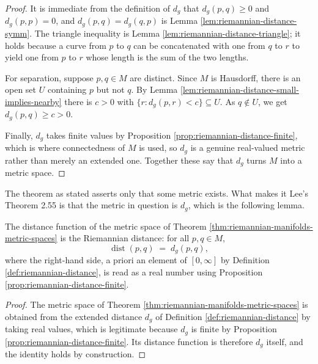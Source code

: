 \begin{proof}
\leanok
{}
It is immediate from the definition of $d_g$ that $d_g(p,q) \ge 0$ and $d_g(p,p) = 0$, and
$d_g(p,q) = d_g(q,p)$ is Lemma \ref{lem:riemannian-distance-symm}. The triangle inequality
is Lemma \ref{lem:riemannian-distance-triangle}; it holds because a curve from $p$ to $q$
can be concatenated with one from $q$ to $r$ to yield one from $p$ to $r$ whose length is
the sum of the two lengths.

For separation, suppose $p, q \in M$ are distinct. Since $M$ is Hausdorff, there is an open
set $U$ containing $p$ but not $q$. By Lemma \ref{lem:riemannian-distance-small-implies-nearby}
there is $c > 0$ with $\{r : d_g(p,r) < c\} \subseteq U$. As $q \notin U$, we get
$d_g(p,q) \ge c > 0$.

Finally, $d_g$ takes finite values by Proposition \ref{prop:riemannian-distance-finite},
which is where connectedness of $M$ is used, so $d_g$ is a genuine real-valued metric rather
than merely an extended one. Together these say that $d_g$ turns $M$ into a metric space.
\end{proof}

The theorem as stated asserts only that some metric exists. What makes it Lee's Theorem 2.55
is that the metric in question is $d_g$, which is the following lemma.

\begin{lemma}
\label{lem:riemannian-metric-space-dist}
\leanok
{}
The distance function of the metric space of Theorem \ref{thm:riemannian-manifolds-metric-spaces}
is the Riemannian distance: for all $p, q \in M$,
\[
  \operatorname{dist}(p,q) \;=\; d_g(p,q),
\]
where the right-hand side, a priori an element of $[0,\infty]$ by
Definition \ref{def:riemannian-distance}, is read as a real number using
Proposition \ref{prop:riemannian-distance-finite}.
\end{lemma}

\begin{proof}
\leanok
{}
The metric space of Theorem \ref{thm:riemannian-manifolds-metric-spaces} is obtained from the
extended distance $d_g$ of Definition \ref{def:riemannian-distance} by taking real values, which
is legitimate because $d_g$ is finite by Proposition \ref{prop:riemannian-distance-finite}. Its
distance function is therefore $d_g$ itself, and the identity holds by construction.
\end{proof}

